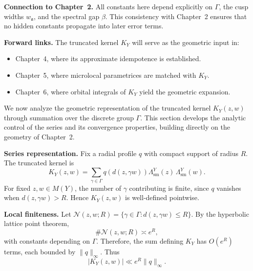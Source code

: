 \medskip

\noindent\textbf{Connection to Chapter~2.}
All constants here depend explicitly on $\Gamma$,
the cusp widths $w_{\mathfrak{a}}$,
and the spectral gap $\beta$.
This consistency with Chapter~2 ensures
that no hidden constants propagate into later error terms.

\medskip

\noindent\textbf{Forward links.}
The truncated kernel $K_{Y}$ will serve as the geometric input in:
\begin{itemize}
  \item Chapter~4, where its approximate idempotence is established.
  \item Chapter~5, where microlocal parametrices are matched with $K_{Y}$.
  \item Chapter~6, where orbital integrals of $K_{Y}$ yield the geometric expansion.
\end{itemize}

\medskip

\noindent


\noindent
We now analyze the geometric representation of the truncated kernel $K_{Y}(z,w)$
through summation over the discrete group $\Gamma$.
This section develops the analytic control of the series and its convergence properties,
building directly on the geometry of Chapter~2.

\medskip

\noindent\textbf{Series representation.}
Fix a radial profile $q$ with compact support of radius $R$.
The truncated kernel is
\[
  K_{Y}(z,w) = \sum_{\gamma\in\Gamma} q\!\left(d(z,\gamma w)\right)
  \Lambda^{Y}_{\mathrm{sm}}(z)\,\Lambda^{Y}_{\mathrm{sm}}(w).
\]
For fixed $z,w\in M(Y)$,
the number of $\gamma$ contributing is finite,
since $q$ vanishes when $d(z,\gamma w)>R$.
Hence $K_{Y}(z,w)$ is well-defined pointwise.

\medskip

\noindent\textbf{Local finiteness.}
Let $\mathcal{N}(z,w;R)=\{\gamma\in\Gamma: d(z,\gamma w)\le R\}$.
By the hyperbolic lattice point theorem,
\[
  \#\mathcal{N}(z,w;R) \asymp e^{R},
\]
with constants depending on $\Gamma$.
Therefore, the sum defining $K_{Y}$ has $O(e^{R})$ terms,
each bounded by $\|q\|_{\infty}$.
Thus
\[
  |K_{Y}(z,w)| \ll e^{R}\|q\|_{\infty}.
\]

\medskip

